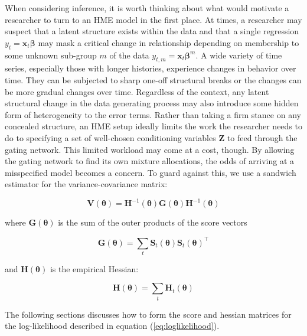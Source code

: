 \documentclass[12pt]{article}
\newcommand{\Ht}[1]{\mathbf{H}_{t}(#1)}
\newcommand{\HH}[1]{\boldsymbol{H}(#1)}
\newcommand{\HI}[1]{\boldsymbol{H}^{-1}(#1)}
\theoremstyle{definition}
\begin{document}
When considering inference, it is worth thinking about what would motivate
a researcher to turn to an HME model in the first place. At times,
a researcher may suspect that a latent structure exists within the data
and that a single regression $y_{t} = \boldsymbol{x}_{t} \boldsymbol{\beta}$
may mask a critical change in relationship depending on membership to
some unknown sub-group $m$ of the data $y_{t,m} = \boldsymbol{x}_{t} \boldsymbol{\beta}^{m}$.
A wide variety of time series, especially those with longer histories,
experience changes in behavior over time. They can be subjected to sharp one-off
structural breaks or the changes can be more gradual changes over time. Regardless of
the context, any latent structural change in the data generating
process may also introduce some hidden form of heterogeneity to the error terms. 
Rather than taking a firm stance on any concealed structure, an HME
setup ideally limits the work the researcher needs to do to specifying
a set of well-chosen conditioning variables $\boldsymbol{Z}$ to feed through the gating
network. This limited workload may come at a cost, though. By allowing the 
gating network to find its own mixture allocations, the odds of arriving at a
misspecified model becomes a concern. To guard against this, we use a sandwich
estimator for the variance-covariance matrix:

\begin{equation} \label{eq:robustgatevarcov}
  \boldsymbol{V}(\boldsymbol{\theta}) = \HI{\boldsymbol{\theta}} \boldsymbol{G}(\boldsymbol{\theta}) \HI{\boldsymbol{\theta}}
\end{equation}

where $\boldsymbol{G}(\boldsymbol{\theta})$ is the sum of the outer products of the score 
vectors

\begin{equation} \label{eq:OPG}
  \boldsymbol{G}(\boldsymbol{\theta}) = \sum_{t} \boldsymbol{S}_{t}(\boldsymbol{\theta}) \boldsymbol{S}_{t}(\boldsymbol{\theta})^\top
\end{equation}

and $\HH{\boldsymbol{\theta}}$ is the empirical Hessian:

\begin{equation} \label{eq:Hessian}
  \HH{\boldsymbol{\theta}} = \sum_{t} \Ht{\boldsymbol{\theta}}
\end{equation}

The following sections discusses how to form the score and hessian matrices 
for the log-likelihood described in equation (\ref{eq:loglikelihood}).
\end{document}
